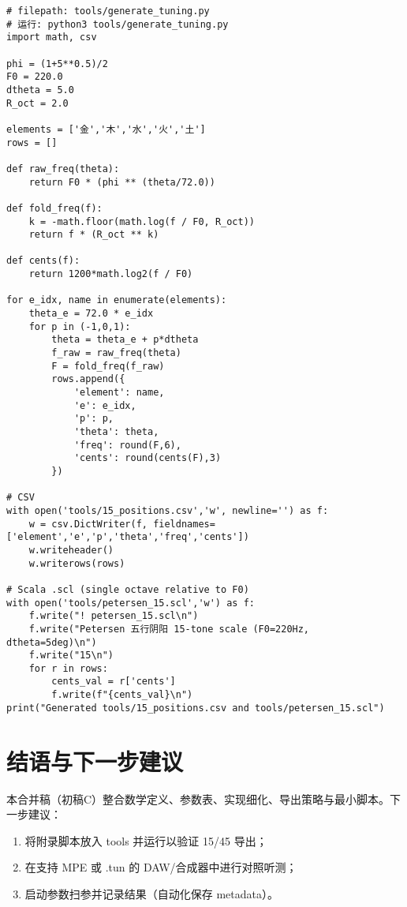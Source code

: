 \documentclass{article}
\begin{document}
\begin{verbatim}
# filepath: tools/generate_tuning.py
# 运行: python3 tools/generate_tuning.py
import math, csv

phi = (1+5**0.5)/2
F0 = 220.0
dtheta = 5.0
R_oct = 2.0

elements = ['金','木','水','火','土']
rows = []

def raw_freq(theta):
    return F0 * (phi ** (theta/72.0))

def fold_freq(f):
    k = -math.floor(math.log(f / F0, R_oct))
    return f * (R_oct ** k)

def cents(f):
    return 1200*math.log2(f / F0)

for e_idx, name in enumerate(elements):
    theta_e = 72.0 * e_idx
    for p in (-1,0,1):
        theta = theta_e + p*dtheta
        f_raw = raw_freq(theta)
        F = fold_freq(f_raw)
        rows.append({
            'element': name,
            'e': e_idx,
            'p': p,
            'theta': theta,
            'freq': round(F,6),
            'cents': round(cents(F),3)
        })

# CSV
with open('tools/15_positions.csv','w', newline='') as f:
    w = csv.DictWriter(f, fieldnames=['element','e','p','theta','freq','cents'])
    w.writeheader()
    w.writerows(rows)

# Scala .scl (single octave relative to F0)
with open('tools/petersen_15.scl','w') as f:
    f.write("! petersen_15.scl\n")
    f.write("Petersen 五行阴阳 15-tone scale (F0=220Hz, dtheta=5deg)\n")
    f.write("15\n")
    for r in rows:
        cents_val = r['cents']
        f.write(f"{cents_val}\n")
print("Generated tools/15_positions.csv and tools/petersen_15.scl")
\end{verbatim}

\section{结语与下一步建议}
本合并稿（初稿C）整合数学定义、参数表、实现细化、导出策略与最小脚本。下一步建议：
\begin{enumerate}
  \item 将附录脚本放入 tools 并运行以验证 15/45 导出；
  \item 在支持 MPE 或 .tun 的 DAW/合成器中进行对照听测；
  \item 启动参数扫参并记录结果（自动化保存 metadata）。
\end{enumerate}
\end{document}
